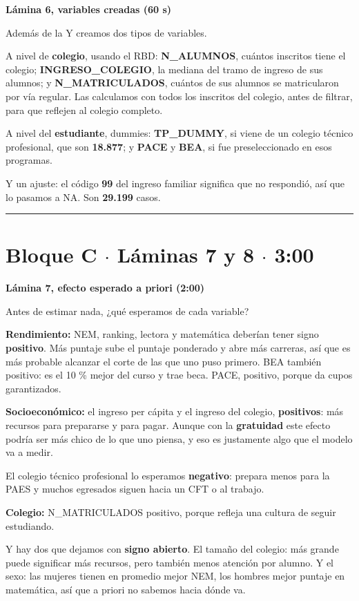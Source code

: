\documentclass[11pt]{article}
\begin{document}
\textbf{Lámina 6, variables creadas (60 s)}\par
\begin{guion}Además de la Y creamos dos tipos de variables.\par A nivel de \textbf{colegio}, usando el RBD: \textbf{N\_ALUMNOS}, cuántos inscritos tiene el colegio; \textbf{INGRESO\_COLEGIO}, la mediana del tramo de ingreso de sus alumnos; y \textbf{N\_MATRICULADOS}, cuántos de sus alumnos se matricularon por vía regular. Las calculamos con todos los inscritos del colegio, antes de filtrar, para que reflejen al colegio completo.\par A nivel del \textbf{estudiante}, dummies: \textbf{TP\_DUMMY}, si viene de un colegio técnico profesional, que son \textbf{18.877}; y \textbf{PACE} y \textbf{BEA}, si fue preseleccionado en esos programas.\par Y un ajuste: el código \textbf{99} del ingreso familiar significa que no respondió, así que lo pasamos a NA. Son \textbf{29.199} casos.\end{guion}

\medskip\hrule\medskip

\section*{Bloque C $\cdot$ Láminas 7 y 8 $\cdot$ 3:00}

\textbf{Lámina 7, efecto esperado a priori (2:00)}\par
\begin{guion}Antes de estimar nada, ¿qué esperamos de cada variable?\par \textbf{Rendimiento:} NEM, ranking, lectora y matemática deberían tener signo \textbf{positivo}. Más puntaje sube el puntaje ponderado y abre más carreras, así que es más probable alcanzar el corte de las que uno puso primero. BEA también positivo: es el 10 \% mejor del curso y trae beca. PACE, positivo, porque da cupos garantizados.\par \textbf{Socioeconómico:} el ingreso per cápita y el ingreso del colegio, \textbf{positivos}: más recursos para prepararse y para pagar. Aunque con la \textbf{gratuidad} este efecto podría ser más chico de lo que uno piensa, y eso es justamente algo que el modelo va a medir.\par El colegio técnico profesional lo esperamos \textbf{negativo}: prepara menos para la PAES y muchos egresados siguen hacia un CFT o al trabajo.\par \textbf{Colegio:} N\_MATRICULADOS positivo, porque refleja una cultura de seguir estudiando.\par Y hay dos que dejamos con \textbf{signo abierto}. El tamaño del colegio: más grande puede significar más recursos, pero también menos atención por alumno. Y el sexo: las mujeres tienen en promedio mejor NEM, los hombres mejor puntaje en matemática, así que a priori no sabemos hacia dónde va.\end{guion}
\end{document}
